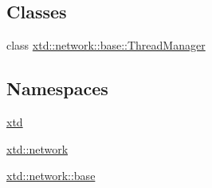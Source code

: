 \subsection*{Classes}
\begin{DoxyCompactItemize}
\item 
class \hyperlink{classxtd_1_1network_1_1base_1_1ThreadManager}{xtd\-::network\-::base\-::\-Thread\-Manager}
\end{DoxyCompactItemize}
\subsection*{Namespaces}
\begin{DoxyCompactItemize}
\item 
\hyperlink{namespacextd}{xtd}
\item 
\hyperlink{namespacextd_1_1network}{xtd\-::network}
\item 
\hyperlink{namespacextd_1_1network_1_1base}{xtd\-::network\-::base}
\end{DoxyCompactItemize}
